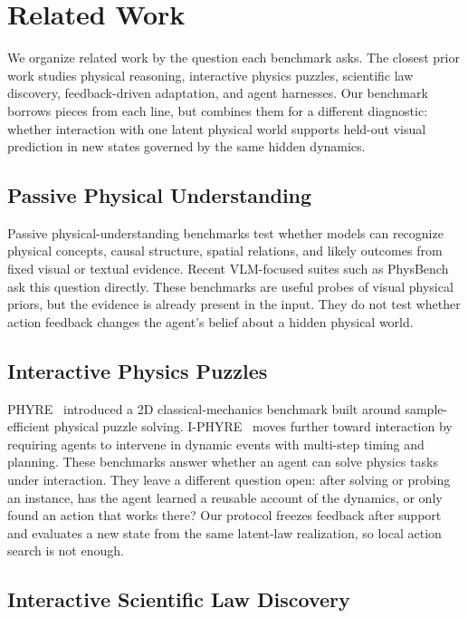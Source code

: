 \section{Related Work}
\label{sec:related}

We organize related work by the question each benchmark asks. The closest prior work studies physical reasoning, interactive physics puzzles, scientific law discovery, feedback-driven adaptation, and agent harnesses. Our benchmark borrows pieces from each line, but combines them for a different diagnostic: whether interaction with one latent physical world supports held-out visual prediction in new states governed by the same hidden dynamics.

\subsection{Passive Physical Understanding}

Passive physical-understanding benchmarks test whether models can recognize physical concepts, causal structure, spatial relations, and likely outcomes from fixed visual or textual evidence. Recent VLM-focused suites such as PhysBench ask this question directly.  These benchmarks are useful probes of visual physical priors, but the evidence is already present in the input. They do not test whether action feedback changes the agent's belief about a hidden physical world.

\subsection{Interactive Physics Puzzles}

PHYRE~\cite{phyre} introduced a 2D classical-mechanics benchmark built around sample-efficient physical puzzle solving. I-PHYRE~\cite{iphyre} moves further toward interaction by requiring agents to intervene in dynamic events with multi-step timing and planning. These benchmarks answer whether an agent can solve physics tasks under interaction. They leave a different question open: after solving or probing an instance, has the agent learned a reusable account of the dynamics, or only found an action that works there? Our protocol freezes feedback after support and evaluates a new state from the same latent-law realization, so local action search is not enough.

\subsection{Interactive Scientific Law Discovery}

